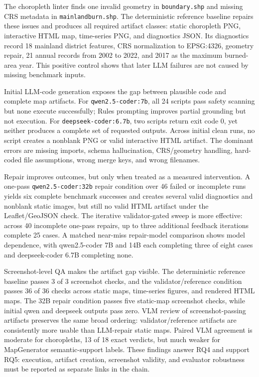 \documentclass[]{interact}
\begin{document}
The choropleth linter finds one invalid geometry in \texttt{boundary.shp} and missing CRS metadata in \texttt{mainlandburn.shp}. The deterministic reference baseline repairs these issues and produces all required artifact classes: static choropleth PNG, interactive HTML map, time-series PNG, and diagnostics JSON. Its diagnostics record 18 mainland district features, CRS normalization to EPSG:4326, geometry repair, 21 annual records from 2002 to 2022, and 2017 as the maximum burned-area year. This positive control shows that later LLM failures are not caused by missing benchmark inputs.

Initial LLM-code generation exposes the gap between plausible code and complete map artifacts. For \texttt{qwen2.5-coder:7b}, all 24 scripts pass safety scanning but none execute successfully; Rules prompting improves partial grounding but not execution. For \texttt{deepseek-coder:6.7b}, two scripts return exit code 0, yet neither produces a complete set of requested outputs. Across initial clean runs, no script creates a nonblank PNG or valid interactive HTML artifact. The dominant errors are missing imports, schema hallucination, CRS/geometry handling, hard-coded file assumptions, wrong merge keys, and wrong filenames.

Repair improves outcomes, but only when treated as a measured intervention. A one-pass \texttt{qwen2.5-coder:32b} repair condition over 46 failed or incomplete runs yields six complete benchmark successes and creates several valid diagnostics and nonblank static images, but still no valid HTML artifact under the Leaflet/GeoJSON check. The iterative validator-gated sweep is more effective: across 40 incomplete one-pass repairs, up to three additional feedback iterations complete 25 cases. A matched near-miss repair-model comparison shows model dependence, with qwen2.5-coder 7B and 14B each completing three of eight cases and deepseek-coder 6.7B completing none.

Screenshot-level QA makes the artifact gap visible. The deterministic reference baseline passes 3 of 3 screenshot checks, and the validator/reference condition passes 36 of 36 checks across static maps, time-series figures, and rendered HTML maps. The 32B repair condition passes five static-map screenshot checks, while initial qwen and deepseek outputs pass zero. VLM review of screenshot-passing artifacts preserves the same broad ordering: validator/reference artifacts are consistently more usable than LLM-repair static maps. Paired VLM agreement is moderate for choropleths, 13 of 18 exact verdicts, but much weaker for MapGenerator semantic-support labels. These findings answer RQ4 and support RQ5: execution, artifact creation, screenshot validity, and evaluator robustness must be reported as separate links in the chain.
\end{document}
